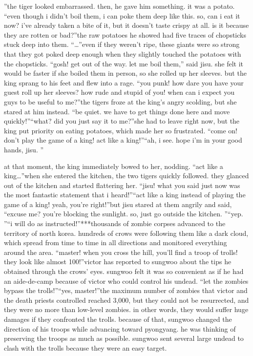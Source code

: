 ”the tiger looked embarrassed.
 then, he gave him something.
 it was a potato.
“even though i didn’t boil them, i can poke them deep like this.
 so, can i eat it now? i’ve already taken a bite of it, but it doesn’t taste crispy at all.
 is it because they are rotten or bad?”the raw potatoes he showed had five traces of chopsticks stuck deep into them.
“…”even if they weren’t ripe, these giants were so strong that they got poked deep enough when they slightly touched the potatoes with the chopsticks.
“gosh! get out of the way.
 let me boil them,” said jisu.
she felt it would be faster if she boiled them in person, so she rolled up her sleeves.
but the king sprang to his feet and flew into a rage.
“you punk! how dare you have your guest roll up her sleeves? how rude and stupid of you! when can i expect you guys to be useful to me?”the tigers froze at the king’s angry scolding, but she stared at him instead.
“be quiet.
 we have to get things done here and move quickly!”“what? did you just say it to me?”she had to leave right now, but the king put priority on eating potatoes, which made her so frustrated.
“come on! don’t play the game of a king! act like a king!”“ah, i see.
 hope i’m in your good hands, jisu.
”

at that moment, the king immediately bowed to her, nodding.
“act like a king…”when she entered the kitchen, the two tigers quickly followed.
 they glanced out of the kitchen and started flattering her.
“jisu! what you said just now was the most fantastic statement that i heard!”“act like a king instead of playing the game of a king! yeah, you’re right!”but jisu stared at them angrily and said, “excuse me? you’re blocking the sunlight.
 so, just go outside the kitchen.
”“yep.
”“i will do as instructed!”***thousands of zombie corpses advanced to the territory of north korea.
 hundreds of crows were following them like a dark cloud, which spread from time to time in all directions and monitored everything around the area.
“master! when you cross the hill, you’ll find a troop of trolls! they look like almost 100!”victor has reported to sungwoo about the tips he obtained through the crows’ eyes.
sungwoo felt it was so convenient as if he had an aide-de-camp because of victor who could control his undead.
“let the zombies bypass the trolls!”“yes, master!”the maximum number of zombies that victor and the death priests controlled reached 3,000, but they could not be resurrected, and they were no more than low-level zombies.
 in other words, they would suffer huge damages if they confronted the trolls.
because of that, sungwoo changed the direction of his troops while advancing toward pyongyang.
 he was thinking of preserving the troops as much as possible.
sungwoo sent several large undead to clash with the trolls because they were an easy target.


 